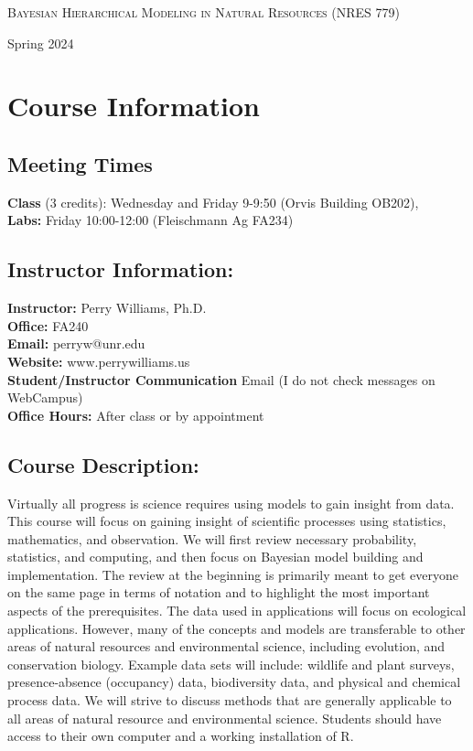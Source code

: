 \documentclass[11pt, a4paper]{article}
\begin{document}
\begin{center} {\Large \textsc{Bayesian Hierarchical Modeling in
      Natural Resources (NRES 779)}}
\end{center}
\begin{center}
  Spring 2024
\end{center}


\section*{Course Information}
\subsection*{Meeting Times}
\textbf{Class} (3 credits): Wednesday and  Friday 9-9:50 (Orvis Building OB202), \\
\textbf{Labs:} Friday 10:00-12:00 (Fleischmann Ag FA234)


\subsection*{Instructor Information:}
\textbf{Instructor:} Perry Williams, Ph.D. \\
\textbf{Office:} FA240\\
\textbf{Email:} perryw@unr.edu\\
\textbf{Website:} www.perrywilliams.us \\
\textbf{Student/Instructor Communication} Email (I do not check messages on WebCampus) \\
\textbf{Office Hours:} After class or by appointment


\subsection*{Course Description:}
Virtually all progress is science requires using models to gain
insight from data. This course will focus on gaining insight of
scientific processes using statistics, mathematics, and
observation. We will first review necessary probability, statistics,
and computing, and then focus on Bayesian model building and
implementation. The review at the beginning is primarily meant to get
everyone on the same page in terms of notation and to highlight the
most important aspects of the prerequisites. The data used in
applications will focus on ecological applications. However, many of
the concepts and models are transferable to other areas of natural
resources and environmental science, including evolution, and
conservation biology. Example data sets will include: wildlife and
plant surveys, presence-absence (occupancy) data,
biodiversity data, and physical
and chemical process data. We will strive to discuss methods that are generally
applicable to all areas of natural resource and environmental
science. Students should have access to their own computer and a
working installation of R.
\end{document}
